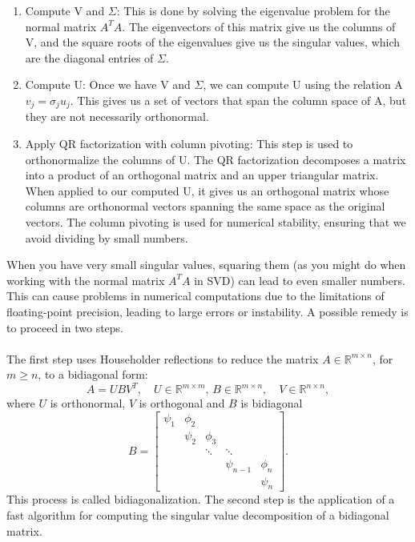 \documentclass[11pt]{book}
\begin{document}
\begin{enumerate}  
\item Compute V and $\Sigma$: This is done by solving the eigenvalue problem for the normal matrix $A^TA$. The eigenvectors of this matrix give us the columns of V, and the square roots of the eigenvalues give us the singular values, which are the diagonal entries of $\Sigma$.  
  
\item Compute U: Once we have V and $\Sigma$, we can compute U using the relation A $v_j = \sigma_j u_j$. This gives us a set of vectors that span the column space of A, but they are not necessarily orthonormal.  
  
\item Apply QR factorization with column pivoting: This step is used to orthonormalize the columns of U. The QR factorization decomposes a matrix into a product of an orthogonal matrix and an upper triangular matrix. When applied to our computed U, it gives us an orthogonal matrix whose columns are orthonormal vectors spanning the same space as the original vectors. The column pivoting is used for numerical stability, ensuring that we avoid dividing by small numbers.  
\end{enumerate}  
When you have very small singular values, squaring them (as you might do when working with the normal matrix $A^TA$ in SVD) can lead to even smaller numbers. This can cause problems in numerical computations due to the limitations of floating-point precision, leading to large errors or instability. A possible remedy is to proceed in two steps.\\ \\
The first step uses Householder reflections to reduce the matrix $A \in \mathbb{R}^{m \times n}$, for $m \geq n$, to a bidiagonal form:
$$
A=U B V^T, \quad U \in \mathbb{R}^{m \times m} \text {, } B \in \mathbb{R}^{m \times n}, \quad V \in \mathbb{R}^{n \times n},
$$
where $U$ is orthonormal, $V$ is orthogonal and $B$ is bidiagonal
$$
B=\left[\begin{array}{ccccc}
\psi_1 & \phi_2 & & & \\
& \psi_2 & \phi_3 & & \\
& & \ddots & \ddots & \\
& & & \psi_{n-1} & \phi_n \\
& & & & \psi_n
\end{array}\right] .
$$
This process is called bidiagonalization. The second step is the application of a fast algorithm for computing the singular value decomposition of a bidiagonal matrix.
\end{document}

